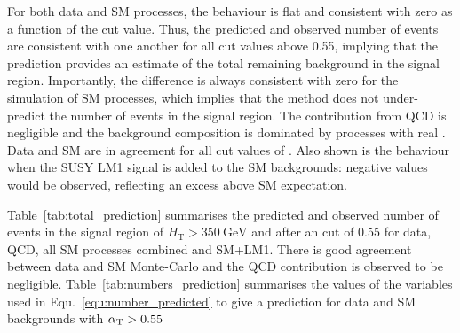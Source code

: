 
For both data and SM processes, the behaviour is flat and consistent
with zero as a function of the \aT cut value. Thus, the predicted and
observed number of events are consistent with one another for all \aT
cut values above 0.55, implying that the prediction provides an
estimate of the total remaining background in the signal
region. Importantly, the difference is always consistent with zero for
the simulation of SM processes, which implies that the method does not
under-predict the number of events in the signal region. The
contribution from QCD is negligible and the background composition is
dominated by processes with real \mymet. Data and SM are in agreement
for all cut values of \aT. Also shown is the behaviour when the SUSY
LM1 signal is added to the SM backgrounds: negative values would be
observed, reflecting an excess above SM expectation.

Table~\ref{tab:total_prediction} summarises the predicted and observed
number of events in the signal region of $H_{\mathrm{T}} >
350~\mathrm{GeV}$ and after an \aT cut of 0.55 for data, QCD, all SM
processes combined and SM+LM1. There is good agreement between data
and SM Monte-Carlo and the QCD contribution is observed to be
negligible.  Table~\ref{tab:numbers_prediction} summarises the values
of the variables used in Equ.~\ref{equ:number_predicted} to give a
prediction for data and SM backgrounds with $\alpha_{\mathrm{T}} > 0.55$


